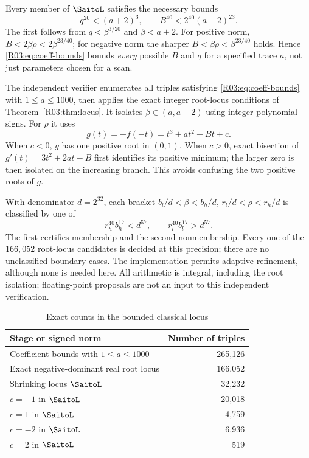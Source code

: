 \documentclass[11pt,a4paper]{article}
\theoremstyle{definition}\newtheorem{definition}[theorem]{Definition}
\theoremstyle{remark}\newtheorem{remark}[theorem]{Remark}
\begin{document}
Every member of $\SaitoL$ satisfies the necessary bounds
\begin{equation}\label{R03:eq:coeff-bounds}
 q^{20}<(a+2)^3,\qquad B^{40}<2^{40}(a+2)^{23}.
\end{equation}
The first follows from $q<\beta^{3/20}$ and $\beta<a+2$.
For positive norm, $B<2\beta\rho<2\beta^{23/40}$; for negative
norm the sharper $B<\beta\rho<\beta^{23/40}$ holds. Hence
\eqref{R03:eq:coeff-bounds} bounds \emph{every} possible $B$ and $q$
for a specified trace $a$, not just parameters chosen for a scan.

The independent verifier enumerates all triples satisfying
\eqref{R03:eq:coeff-bounds} with $1\le a\le1000$, then applies the exact
integer root-locus conditions of Theorem~\ref{R03:thm:locus}. It isolates
$\beta\in(a,a+2)$ using integer polynomial signs. For $\rho$ it uses
\[
 g(t)=-f(-t)=t^3+at^2-Bt+c.
\]
When $c<0$, $g$ has one positive root in $(0,1)$. When $c>0$, exact
bisection of $g'(t)=3t^2+2at-B$ first identifies its positive minimum;
the larger zero is then isolated on the increasing branch. This
avoids confusing the two positive roots of $g$.

With denominator $d=2^{32}$, each bracket
$b_l/d<\beta<b_h/d$, $r_l/d<\rho<r_h/d$ is classified by one of
\begin{equation}\label{R03:eq:integer-classification}
 r_h^{40}b_h^{17}<d^{57},\qquad
 r_l^{40}b_l^{17}>d^{57}.
\end{equation}
The first certifies membership and the second nonmembership. Every
one of the $166,052$ root-locus candidates is decided at this precision;
there are no unclassified boundary cases. The implementation permits
adaptive refinement, although none is needed here. All arithmetic is
integral, including the root isolation; floating-point proposals are
not an input to this independent verification.

\begin{table}[ht]
\centering
\caption{Exact counts in the bounded classical locus}
\label{R03:tab:counts}
\begin{tabular}{lr}
\toprule
Stage or signed norm & Number of triples\\
\midrule
Coefficient bounds with $1\le a\le1000$ & 265,126\\
Exact negative-dominant real root locus & 166,052\\
Shrinking locus $\SaitoL$ & 32,232\\
\midrule
$c=-1$ in $\SaitoL$ &20,018\\
$c=1$ in $\SaitoL$ &4,759\\
$c=-2$ in $\SaitoL$ &6,936\\
$c=2$ in $\SaitoL$ &519\\
\bottomrule
\end{tabular}
\end{table}
\end{document}

